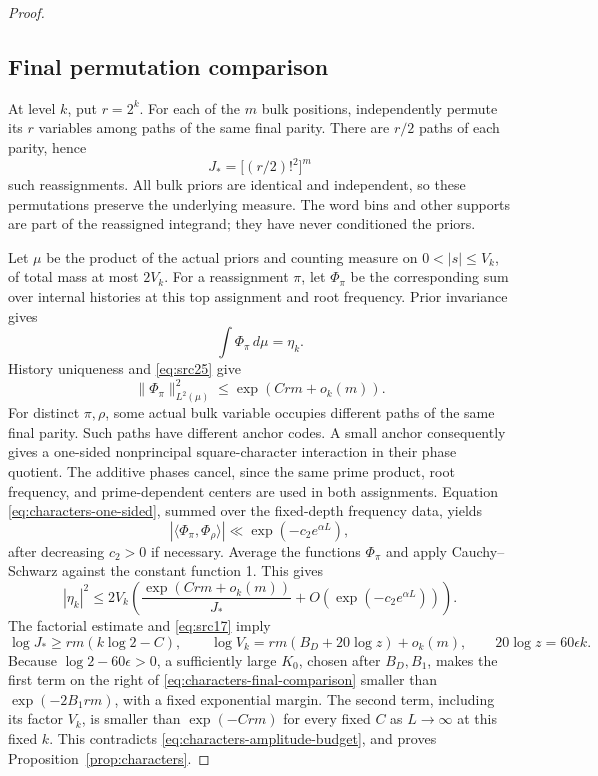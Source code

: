 \begin{proof}
\subsection*{Final permutation comparison}

At level \(k\), put \(r=2^k\). For each of the \(m\) bulk
positions, independently permute its \(r\) variables among
paths of the same final parity. There are \(r/2\) paths
of each parity, hence
\[
 J_*=\big[(r/2)!^2\big]^m
\]
such reassignments. All bulk priors are identical and
independent, so these permutations preserve the underlying
measure. The word bins and other supports are part of the
reassigned integrand; they have never conditioned the priors.

Let \(\mu\) be the product of the actual priors and counting
measure on \(0<|s|\le V_k\), of total mass at most \(2V_k\).
For a reassignment \(\pi\), let \(\Phi_\pi\) be the
corresponding sum over internal histories at this top
assignment and root frequency. Prior invariance gives
\[
 \int\Phi_\pi\,d\mu=\eta_k.
\]
History uniqueness and \eqref{eq:src25} give
\[
 \|\Phi_\pi\|_{L^2(\mu)}^2
       \le \exp(Crm+o_k(m)).
\]
For distinct \(\pi,\rho\), some actual bulk variable occupies
different paths of the same final parity. Such paths have
different anchor codes. A small anchor consequently gives
a one-sided nonprincipal square-character interaction in
their phase quotient. The additive phases cancel, since
the same prime product, root frequency, and prime-dependent
centers are used in both assignments. Equation
\eqref{eq:characters-one-sided}, summed over the
fixed-depth frequency data, yields
\[
 |\langle\Phi_\pi,\Phi_\rho\rangle|
   \ll\exp(-c_2e^{\alpha L}),
\]
after decreasing \(c_2>0\) if necessary.
Average the functions \(\Phi_\pi\) and apply
Cauchy--Schwarz against the constant function 1. This gives
\begin{equation}\label{eq:characters-final-comparison}
 |\eta_k|^2\le
 2V_k\left(
   \frac{\exp(Crm+o_k(m))}{J_*}
        +O\!\left(\exp(-c_2e^{\alpha L})\right)\right).
\end{equation}
The factorial estimate and \eqref{eq:src17} imply
\[
 \log J_*\ge rm(k\log2-C),\qquad
 \log V_k=rm(B_D+20\log z)+o_k(m),
 \qquad 20\log z=60\epsilon k.
\]
Because \(\log2-60\epsilon>0\), a sufficiently large
\(K_0\), chosen after \(B_D,B_1\), makes the first term
on the right of \eqref{eq:characters-final-comparison}
smaller than \(\exp(-2B_1rm)\), with a fixed exponential
margin. The second term, including its factor \(V_k\),
is smaller than \(\exp(-Crm)\) for every fixed \(C\)
as \(L\to\infty\) at this fixed \(k\).
This contradicts \eqref{eq:characters-amplitude-budget},
and proves Proposition~\ref{prop:characters}.
\end{proof}

